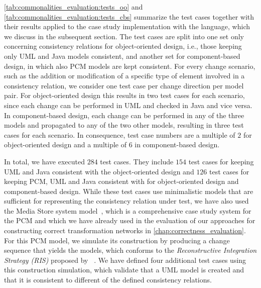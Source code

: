 \autoref{tab:commonalities_evaluation:tests_oo} and \autoref{tab:commonalities_evaluation:tests_cbs} summarize the test cases together with their results applied to the case study implementation with the \commonalities language, which we discuss in the subsequent section.
The test cases are split into one set only concerning consistency relations for object-oriented design, i.e., those keeping only \gls{UML} and Java models consistent, and another set for component-based design, in which also \gls{PCM} models are kept consistent.
For every change scenario, such as the addition or modification of a specific type of element involved in a consistency relation, we consider one test case per change direction per model pair.
For object-oriented design this results in two test cases for each scenario, since each change can be performed in \gls{UML} and checked in Java and vice versa.
In component-based design, each change can be performed in any of the three models and propagated to any of the two other models, resulting in three test cases for each scenario.
In consequence, test case numbers are a multiple of $2$ for object-oriented design and a multiple of $6$ in component-based design.

In total, we have executed $284$ test cases.
They include $154$ test cases for keeping \gls{UML} and Java consistent with the object-oriented design \commonalities and $126$ test cases for keeping \gls{PCM}, \gls{UML} and Java consistent with \commonalities for object-oriented design and component-based design.
While these test cases use minimalistic models that are sufficient for representing the consistency relation under test, we have also used the Media Store system model~\cite{strittmatter2016a}, which is a comprehensive case study system for the \gls{PCM} and which we have already used in the evaluation of our approaches for constructing correct transformation networks in \autoref{chap:correctness_evaluation}.
For this \gls{PCM} model, we simulate its construction by producing a change sequence that yields the models, which conforms to the \emph{Reconstructive Integration Strategy (RIS)} proposed by \citeauthor{langhammer2017a}~\cite{langhammer2017a,klare2020Vitruv-JSS}.
We have defined four additional test cases using this construction simulation, which validate that a \gls{UML} model is created and that it is consistent to different of the defined consistency relations.


